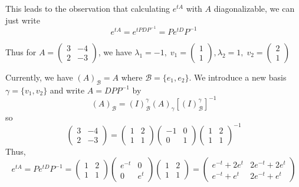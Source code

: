 \documentclass[12pt]{article}
\begin{document}
    This leads to the observation that calculating $e^{tA}$ with $A$ diagonalizable, we can just write 
    \[e^{tA} = e^{tPDP^{-1}} = Pe^{tD}P^{-1}\]

    Thus for $A = \begin{pmatrix}
        3 & -4\\ 
        2 & -3
    \end{pmatrix}$, we have $\lambda_1 = -1, \; v_1 = \begin{pmatrix}
        1\\1
    \end{pmatrix}, \lambda_2 = 1, \; v_2 = \begin{pmatrix}
        2\\1
    \end{pmatrix}$

    Currently, we have $(A)_{\mathcal{B}} = A$ where $\mathcal{B} = \{e_1, e_2\}$. We introduce a new basis $\gamma = \{v_1, v_2\}$ and write $A = DPP^{-1}$ by 
    \[(A)_{\mathcal{B}} = (I)^{\gamma}_{\mathcal{B}} (A)_{\gamma} [(I)^{\gamma}_{\mathcal{B}}]^{-1}\] 
    so 
    \[\begin{pmatrix}
        3 & -4\\ 
        2 & -3
    \end{pmatrix} = \begin{pmatrix}
        1 & 2\\ 
        1 & 1
    \end{pmatrix} \begin{pmatrix}
        -1 & 0\\ 
        0 & 1
    \end{pmatrix} \begin{pmatrix}
        1 & 2\\ 
        1 & 1
    \end{pmatrix}^{-1}\] 
    Thus, 
    \[e^{tA} = Pe^{tD} P^{-1} = \begin{pmatrix}
        1 & 2\\ 
        1 & 1
    \end{pmatrix} \begin{pmatrix}
        e^{-t} & 0\\
        0 & e^t
    \end{pmatrix} \begin{pmatrix}
        1 & 2\\ 
        1 & 1
    \end{pmatrix} = \begin{pmatrix}
        e^{-t} + 2e^t & 2e^{-t} + 2e^t\\ 
        e^{-t} + e^t & 2e^{-t} + e^t
    \end{pmatrix}\]
\end{document}
